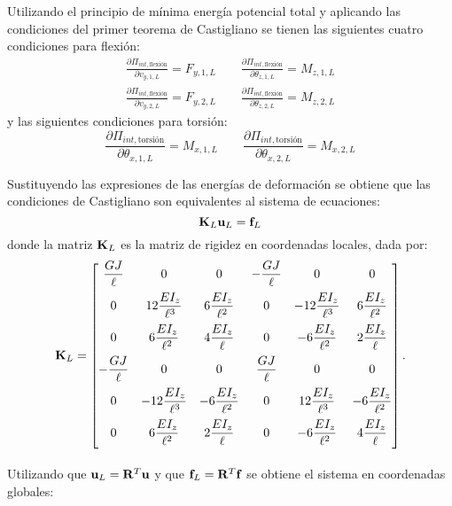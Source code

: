 Utilizando el principio de mínima energía potencial total y aplicando las condiciones del primer teorema de Castigliano se tienen las siguientes cuatro condiciones para flexión:
\begin{eqnarray}
\frac{\partial \Pi_{int,\text{flexión}}}{\partial v_{y,1,L}} =  F_{y,1,L}  \qquad \frac{\partial \Pi_{int,\text{flexión}}}{\partial \theta_{z,1,L}} =  M_{z,1,L} \\
\frac{\partial \Pi_{int,\text{flexión}}}{\partial v_{y,2,L}} =  F_{y,2,L} \qquad \frac{\partial \Pi_{int,\text{flexión}}}{\partial \theta_{z,2,L}} =  M_{z,2,L}
\end{eqnarray}
y las siguientes condiciones para torsión:
%
\begin{equation}
\frac{\partial \Pi_{int,\text{torsión}}}{\partial \theta_{x,1,L}} =  M_{x,1,L} \qquad 
\frac{\partial \Pi_{int,\text{torsión}}}{\partial \theta_{x,2,L}} =  M_{x,2,L}
\end{equation}

Sustituyendo las expresiones de las energías de deformación se obtiene que las condiciones de Castigliano son equivalentes al sistema de ecuaciones:
\begin{equation}
{\bf K}_L {\bf u}_L = {\bf f}_L
\end{equation}
%
donde la matriz ${\bf K}_L$ es la matriz de rigidez en coordenadas locales, dada por:
%
\begin{equation}\label{eqn:matrigtf}
	{\bf K}_L = \left[
	\begin{matrix}
		\dfrac{GJ}{\ell} & 0 & 0 & - \dfrac{GJ}{\ell} & 0 & 0 \\[3mm]
		0 &  12 \dfrac{EI_z}{\ell^{3}} & 6 \dfrac{EI_z}{\ell^{2}} &  0& -12 \dfrac{EI_z}{\ell^{3}} & 6 \dfrac{EI_z}{\ell^{2}} \\[3mm]
		0 &  6 \dfrac{EI_z}{\ell^{2}} & 4 \dfrac{EI_z}{\ell} & 0& -6 \dfrac{EI_z}{\ell^{2}} & 2 \dfrac{EI_z}{\ell} \\[3mm]
		-\dfrac{GJ}{\ell} & 0 & 0 &  \dfrac{GJ}{\ell} & 0 & 0 \\[3mm]
		0 &  -12 \dfrac{EI_z}{\ell^{3}} & -6 \dfrac{EI_z}{\ell^{2}} &0&  12 \dfrac{EI_z}{\ell^{3}} & -6 \dfrac{EI_z}{\ell^{2}} \\[3mm]
		0 &  6 \dfrac{EI_z}{\ell^{2}} & 2 \dfrac{EI_z}{\ell} & 0 & -6 \dfrac{EI_z}{\ell^{2}} & 4 \dfrac{EI_z}{\ell} \\[3mm]
	\end{matrix}
	\right].
\end{equation}

Utilizando que ${\bf u}_L = {\bf R}^T {\bf u}$  y que  ${\bf f}_L = {\bf R}^T {\bf f}$  se obtiene el sistema en coordenadas globales:

